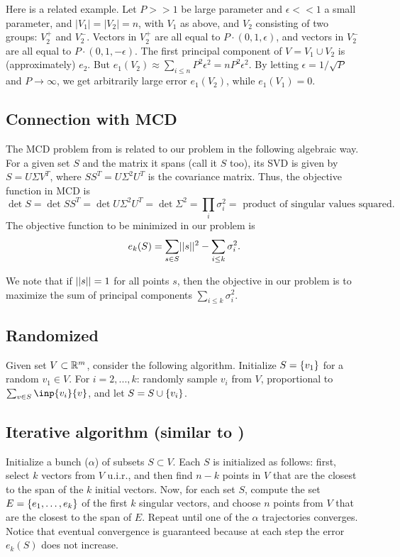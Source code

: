 \documentclass{article}
\begin{document}
Here is a related example. Let $P >> 1$ be large parameter and $\epsilon << 1$ a small parameter, and $|V_1| = |V_2| = n$, with $V_1$ as above, and $V_2$ consisting of two groups: $V_2^+$ and $V_2^-$. Vectors in $V_2^+$ are all equal to $P\cdot(0,1,\epsilon)$, and vectors in $V_2^-$ are all equal to $P\cdot(0,1,-\epsilon)$. The first principal component of $V = V_1\cup V_2$ is (approximately) $e_2$. But $e_1(V_2) \approx \sum_{i\leq n}P^2\epsilon^2 = n P^2\epsilon^2$. By letting $\epsilon = 1/\sqrt{P}$ and $P\to \infty$, we get arbitrarily large error $e_1(V_2)$, while $e_1(V_1) = 0$.

\subsection{Connection with MCD}
The MCD problem from \cite{bernholt2004complexity} is related to our problem in the following algebraic way. For a given set $S$ and the matrix it spans (call it $S$ too), its SVD is given by $S = U \Sigma V^T$, where $SS^T = U \Sigma^2 U^T$ is the covariance matrix. Thus, the objective function in MCD is $$\det{S} = \det{SS^T} = \det{U \Sigma^2 U^T} = \det{\Sigma^2} = \prod_{i}\sigma_i^2 = \text{ product of singular values squared}.$$ The objective function to be minimized in our problem is $$e_k(S) = \sum_{s\in S}\norm{s}^2 - \sum_{i\leq k}\sigma_i^2.$$

We note that if $||s|| = 1$ for all points $s$, then the objective in our problem is to maximize the sum of principal components $\sum_{i\leq k}\sigma_i^2$.

\subsection{Randomized}
Given set $V \subset \mathbb{R}^m$, consider the following algorithm.
Initialize $S = \left\{v_1\right\}$ for a random $v_1\in V$. For $i=2,...,k$: randomly sample $v_i$ from $V$, proportional to $\sum_{v\in S}\inp{v_i}{v}$, and let $S = S\cup \left\{v_i\right\}$. 

\subsection{Iterative algorithm (similar to \cite{rousseeuw1999fast})}
Initialize a bunch ($\alpha$) of subsets $S\subset V$. Each $S$ is initialized as follows: first, select $k$ vectors from $V$ u.i.r., and then find $n-k$ points in $V$ that are the closest to the span of the $k$ initial vectors. Now, for each set $S$, compute the set $E = \left\{e_1,\dots, e_k\right\}$ of the first $k$ singular vectors, and choose $n$ points from $V$ that are the closest to the span of $E$. Repeat until one of the $\alpha$ trajectories converges. Notice that eventual convergence is guaranteed because at each step the error $e_k(S)$ does not increase.
\end{document}
